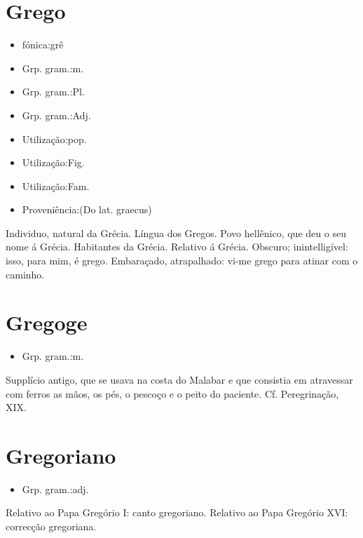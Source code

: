 \section{Grego}
\begin{itemize}
\item {fónica:grê}
\end{itemize}
\begin{itemize}
\item {Grp. gram.:m.}
\end{itemize}
\begin{itemize}
\item {Grp. gram.:Pl.}
\end{itemize}
\begin{itemize}
\item {Grp. gram.:Adj.}
\end{itemize}
\begin{itemize}
\item {Utilização:pop.}
\end{itemize}
\begin{itemize}
\item {Utilização:Fig.}
\end{itemize}
\begin{itemize}
\item {Utilização:Fam.}
\end{itemize}
\begin{itemize}
\item {Proveniência:(Do lat. \textunderscore graecus\textunderscore )}
\end{itemize}
Individuo, natural da Grécia.
Língua dos Gregos.
Povo hellênico, que deu o seu nome á Grécia.
Habitantes da Grécia.
Relativo á Grécia.
Obscuro; inintelligível: \textunderscore isso, para mim, é grego\textunderscore .
Embaraçado, atrapalhado: \textunderscore vi-me grego para atinar com o caminho\textunderscore .
\section{Gregoge}
\begin{itemize}
\item {Grp. gram.:m.}
\end{itemize}
Supplício antigo, que se usava na costa do Malabar e que consistia em atravessar com ferros as mãos, os pés, o pescoço e o peito do paciente. Cf. \textunderscore Peregrinação\textunderscore , XIX.
\section{Gregoriano}
\begin{itemize}
\item {Grp. gram.:adj.}
\end{itemize}
Relativo ao Papa Gregório I: \textunderscore canto gregoriano\textunderscore .
Relativo ao Papa Gregório XVI: \textunderscore correcção gregoriana\textunderscore .
